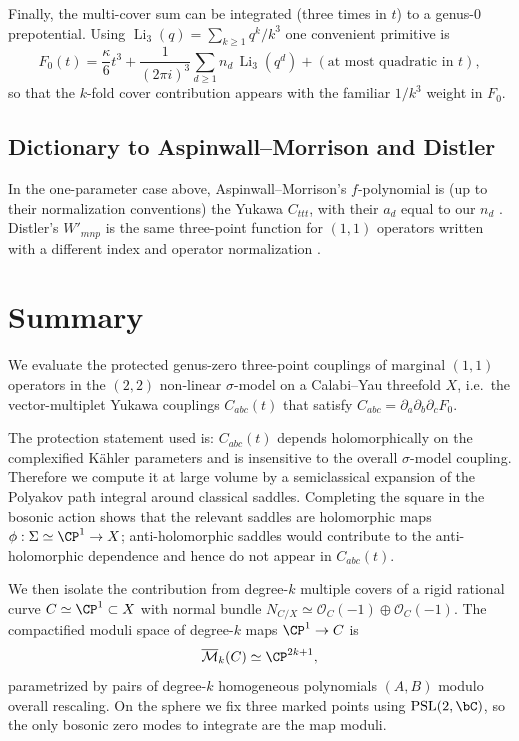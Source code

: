 \documentclass[12pt]{article}
\begin{document}
Finally, the multi-cover sum can be integrated (three times in $t$) to a genus-0
prepotential. Using $\operatorname{Li}_3(q)=\sum_{k\ge1}q^k/k^3$ one convenient
primitive is
\begin{equation}
  F_0(t)
  = \frac{\kappa}{6}t^3 + \frac{1}{(2\pi i)^3}\sum_{d\ge1} n_d\,\operatorname{Li}_3(q^d)
  +(\text{at most quadratic in }t),
\end{equation}
so that the $k$-fold cover contribution appears with the familiar $1/k^3$ weight
in $F_0$.

\subsection{Dictionary to Aspinwall--Morrison and Distler}
In the one-parameter case above, Aspinwall--Morrison's $f$-polynomial is (up to
their normalization conventions) the Yukawa $C_{ttt}$, with their $a_d$ equal to
our $n_d$ \cite{AspinwallMorrison:1991tft}. Distler's $W'_{mnp}$ is the same
three-point function for $(1,1)$ operators written with a different index and
operator normalization \cite{Distler:1992n2}.

\section{Summary}
\label{sec:summary}
We evaluate the protected genus-zero three-point couplings of marginal $(1,1)$
operators in the $(2,2)$ non-linear $\sigma$-model on a Calabi--Yau threefold
$X$, i.e.\ the vector-multiplet Yukawa couplings $C_{abc}(t)$ that satisfy
$C_{abc}=\partial_a\partial_b\partial_c F_0$.

The protection statement used is: $C_{abc}(t)$ depends holomorphically on the
complexified K\"ahler parameters and is insensitive to the overall $\sigma$-model
coupling. Therefore we compute it at large volume by a semiclassical expansion
of the Polyakov path integral around classical saddles. Completing the square in
the bosonic action shows that the relevant saddles are holomorphic maps
$\phi:\Sigma\simeq\CP^1\to X$; anti-holomorphic saddles would contribute to the
anti-holomorphic dependence and hence do not appear in $C_{abc}(t)$.

We then isolate the contribution from degree-$k$ multiple covers of a rigid
rational curve $C\simeq\CP^1\subset X$ with normal bundle
$N_{C/X}\simeq\mathcal{O}_C(-1)\oplus\mathcal{O}_C(-1)$. The compactified moduli
space of degree-$k$ maps $\CP^1\to C$ is
\begin{equation*}
  \overline{\mathcal{M}}_k(C)\simeq\CP^{2k+1},
\end{equation*}
parametrized by pairs of degree-$k$ homogeneous polynomials $(A,B)$ modulo
overall rescaling. On the sphere we fix three marked points using
$\mathrm{PSL}(2,\bC)$, so the only bosonic zero modes to integrate are the map
moduli.
\end{document}
